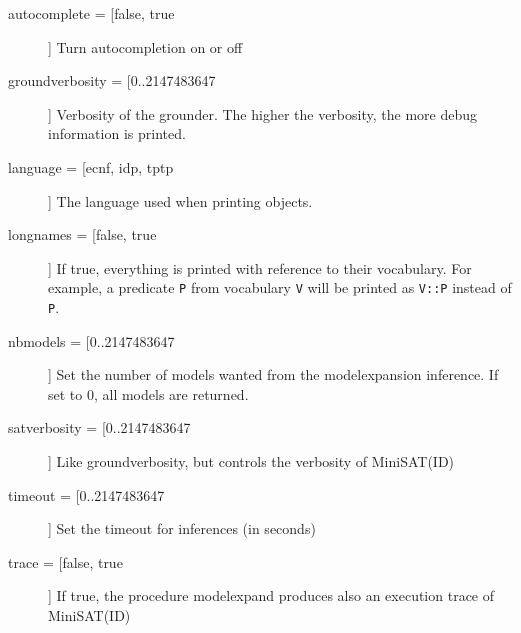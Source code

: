 \documentclass[a4]{article}
\newcommand{\msid}{{\sc MiniSAT(ID)}\xspace}
\newcommand{\minisatid}{\msid}
\newcommand{\code}[1]{{\tt #1}}
\newcommand{\todo}[1]{\textcolor{blue}{TODO: #1}}
\begin{document}
\begin{description}
	\item[autocomplete = [false, true]] Turn autocompletion on or off
	\item[groundverbosity = [0..2147483647]] Verbosity of the grounder.  The higher the verbosity, the more debug information is printed.
	\item[language = [ecnf, idp, %
				tptp]] The language used when printing objects. 
	\item[longnames = [false, true]] If true, everything is printed with reference to their vocabulary.  For example, a predicate \code{P} from vocabulary \code{V} will be printed as \code{V::P} instead of \code{P}.
	\item[nbmodels = [0..2147483647]] Set the number of models wanted from the modelexpansion inference.  If set to 0, all models are returned.
	\item[satverbosity = [0..2147483647]] Like groundverbosity, but controls the verbosity of \minisatid
	\item[timeout = [0..2147483647]] Set the timeout for inferences (in seconds)
	\item[trace = [false, true]] If true, the procedure modelexpand produces also an execution trace of \minisatid 

\end{description}
\end{document}
